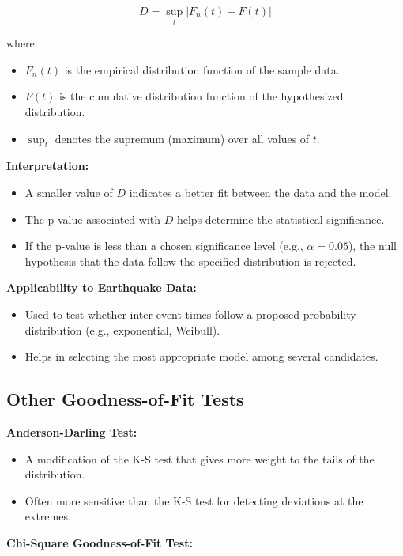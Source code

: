 \documentclass{article}
\begin{document}
\[
D = \sup_t | F_n(t) - F(t) |
\]

where:

\begin{itemize}
    \item $F_n(t)$ is the empirical distribution function of the sample data.
    \item $F(t)$ is the cumulative distribution function of the hypothesized distribution.
    \item $\sup_t$ denotes the supremum (maximum) over all values of $t$.
\end{itemize}

\textbf{Interpretation:}

\begin{itemize}
    \item A smaller value of $D$ indicates a better fit between the data and the model.
    \item The p-value associated with $D$ helps determine the statistical significance.
    \item If the p-value is less than a chosen significance level (e.g., $\alpha = 0.05$), the null hypothesis that the data follow the specified distribution is rejected.
\end{itemize}

\textbf{Applicability to Earthquake Data:}

\begin{itemize}
    \item Used to test whether inter-event times follow a proposed probability distribution (e.g., exponential, Weibull).
    \item Helps in selecting the most appropriate model among several candidates.
\end{itemize}

\subsection{Other Goodness-of-Fit Tests}

\textbf{Anderson-Darling Test:}

\begin{itemize}
    \item A modification of the K-S test that gives more weight to the tails of the distribution.
    \item Often more sensitive than the K-S test for detecting deviations at the extremes.
\end{itemize}

\textbf{Chi-Square Goodness-of-Fit Test:}
\end{document}
